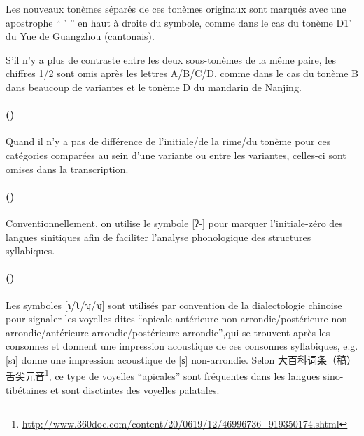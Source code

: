 \documentclass{scrbook}
\newcounter{c}[subsubsection]
\newcommand{\stpc}[1]{\stepcounter{#1}}
\begin{document}
\begin{sloppypar}
Les nouveaux tonèmes séparés de ces tonèmes originaux sont marqués avec une apostrophe `` ' '' en haut à droite du symbole, comme dans le cas du tonème D1' du Yue de Guangzhou (cantonais). 

S'il n'y a plus de contraste entre les deux sous-tonèmes de la même paire, les chiffres 1/2 sont omis après les lettres A/B/C/D, comme dans le cas du tonème B dans beaucoup de variantes et le tonème D du mandarin de Nanjing.


\stpc{c}\paragraph{()}
Quand il n'y a pas de différence de l'initiale/de la rime/du tonème pour ces catégories comparées au sein d'une variante ou entre les variantes, celles-ci sont omises dans la transcription.

\stpc{c}\paragraph{()}
Conventionnellement, on utilise le symbole [ʔ-] pour marquer l'initiale-zéro des langues sinitiques afin de faciliter l'analyse phonologique des structures syllabiques.

\stpc{c}\paragraph{()}
Les symboles [ɿ/ʅ/ʮ/ʯ] sont utilisés par convention de la dialectologie chinoise pour signaler les voyelles dites ``apicale antérieure non-arrondie/postérieure non-arrondie/antérieure arrondie/postérieure arrondie'',qui se trouvent après les consonnes et donnent une impression acoustique de ces consonnes syllabiques, e.g. [sɿ] donne une impression acoustique de [s̩] non-arrondie. Selon 大百科词条（稿）舌尖元音\footnote{\url{http://www.360doc.com/content/20/0619/12/46996736_919350174.shtml}}, ce type de voyelles ``apicales'' sont fréquentes dans les langues sino-tibétaines et sont disctintes des voyelles palatales.


\end{sloppypar}
\end{document}
